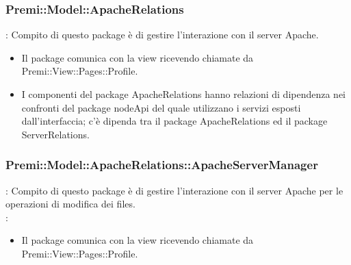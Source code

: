\subsubsection{Premi::Model::ApacheRelations}{
		\textbf{\tipo}: Compito di questo package è di gestire l'interazione con il server Apache.\\
		\begin{itemize}
			\item Il package comunica con la view ricevendo chiamate da Premi::View::Pages::Profile.
			\item I componenti del package ApacheRelations hanno relazioni di dipendenza nei confronti del package nodeApi del quale utilizzano i servizi esposti dall’interfaccia; c’è dipenda tra il package ApacheRelations ed il package ServerRelations.\\
		\end{itemize}

\subsubsection{Premi::Model::ApacheRelations::ApacheServerManager}{
		\textbf{\tipo}: Compito di questo package è di gestire l'interazione con il server Apache per le operazioni di modifica dei files.\\
		\textbf{\relaz}:
		\begin{itemize}
			\item Il package comunica con la view ricevendo chiamate da Premi::View::Pages::Profile.
		\end{itemize}

}}

